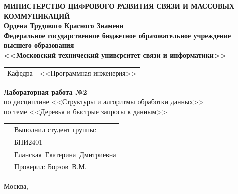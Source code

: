 \thispagestyle{empty}

\begin{center}
	\textbf{МИНИСТЕРСТВО ЦИФРОВОГО РАЗВИТИЯ СВЯЗИ И МАССОВЫХ КОММУНИКАЦИЙ} \\
	\textbf{Ордена Трудового Красного Знамени \\
		Федеральное государственное бюджетное образовательное учреждение высшего образования \\
		<<Московский технический университет связи и информатики>>}
\end{center}

\vspace{0.3em}

\begin{center}
	\begin{tabularx}{0.55\textwidth}{p{1.2cm}X}
		Кафедра & \quad <<Программная инженерия>> \\%
	\end{tabularx}
\end{center}

\vspace{12em}

\begin{center}
	\Large
	\textbf{Лабораторная работа №2} \\
	\large
	по дисциплине <<Структуры и алгоритмы обработки данных>> \\
	по теме <<Деревья и быстрые запросы к данным>>
\end{center}

\vspace{3em}

\renewcommand{\arraystretch}{1.1}
\begin{tabularx}{\textwidth}{p{8cm}p{7cm}}
	& Выполнил студент группы: \\
	& БПИ2401 \\
	& Еланская~Екатерина~Дмитриевна\\
	& Проверил: Борзов~В.М.\\
\end{tabularx}

\vspace{8em}

\begin{center}
	Москва,~\the\year
\end{center}
\clearpage


